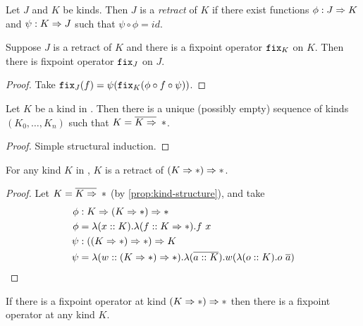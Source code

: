 \begin{definition}
  Let $J$ and $K$ be kinds. Then $J$ is a \emph{retract} of $K$ if
  there exist functions $\phi: J \Rightarrow K$ and $\psi : K \Rightarrow J$
  such that $\psi \circ \phi = id$.
\end{definition}

\begin{proposition}
   \label{prop:retracts-fixed-points}
  Suppose $J$ is a retract of $K$ and there is a fixpoint operator \textnormal{$\operatorname{\texttt{fix}}_K$} on $K$.
  Then there is fixpoint operator \textnormal{$\operatorname{\texttt{fix}}_J$} on $J$.
\end{proposition}
\begin{proof}
  Take $\operatorname{\texttt{fix}}_J(f) = \psi (\operatorname{\texttt{fix}}_K (\phi \circ f \circ \psi))$.
\end{proof}

\begin{proposition}
  \label{prop:kind-structure}
  Let $K$ be a kind in \FOMF{}. Then there is a unique (possibly empty) sequence
  of kinds $(K_0, \dots, K_n)$ such that $K = \overline{K \Rightarrow}\ \operatorname{\ast}$.
\end{proposition}
\begin{proof}
  Simple structural induction.
\end{proof}

\begin{proposition}
  For any kind $K$ in \FOMF{}, $K$ is a retract of $(K \Rightarrow \operatorname{\ast})
  \Rightarrow \operatorname{\ast}$.
\end{proposition}
\begin{proof}
  Let $K = \overline{K \Rightarrow}\ \operatorname{\ast}$ (by \cref{prop:kind-structure}), and take
  \begin{align*}
    \phi &: K \Rightarrow (K \Rightarrow \operatorname{\ast}) \Rightarrow \operatorname{\ast} \\
    \phi &= \lambda (x :: K) . \lambda (f :: K \Rightarrow \operatorname{\ast}) . f\ x\\
    \psi &: ((K \Rightarrow \operatorname{\ast}) \Rightarrow \operatorname{\ast}) \Rightarrow K\\
    \psi &= \lambda (w :: (K \Rightarrow \operatorname{\ast}) \Rightarrow \operatorname{\ast}) . \lambda (\overline{a :: K}) . w (\lambda (o :: K) . o\ \overline{a})\\
  \end{align*}
\end{proof}

\begin{corollary}
  If there is a fixpoint operator at kind $(K \Rightarrow \operatorname{\ast}) \Rightarrow \operatorname{\ast}$ then there is a fixpoint operator at any kind $K$.
\end{corollary}

